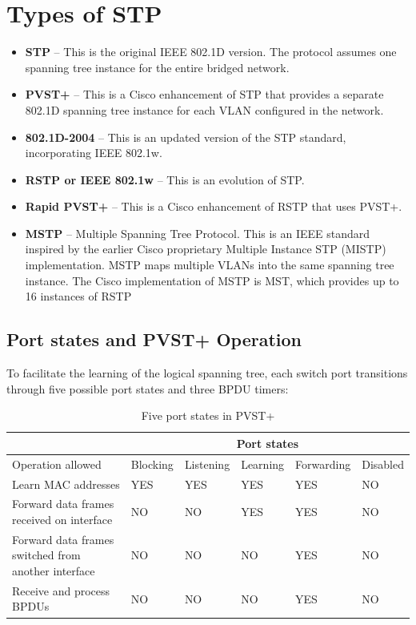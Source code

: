 \section{Types of STP}
\begin{itemize}
\item \textbf{STP} -- This is the original IEEE 802.1D version. The protocol assumes one spanning tree instance for the entire bridged network.
\item \textbf{PVST+} -- This is a Cisco enhancement of STP that provides a separate 802.1D spanning tree instance for each VLAN configured in the network.
\item \textbf{802.1D-2004} -- This is an updated version of the STP standard, incorporating IEEE 802.1w.
\item \textbf{RSTP or IEEE 802.1w} -- This is an evolution of STP.
\item \textbf{Rapid PVST+} -- This is a Cisco enhancement of RSTP that uses PVST+.
\item \textbf{MSTP} -- Multiple Spanning Tree Protocol. This is an IEEE standard inspired by the earlier Cisco proprietary Multiple Instance STP (MISTP) implementation. MSTP maps multiple VLANs into the same spanning tree instance. The Cisco implementation of MSTP is MST, which provides up to 16 instances of RSTP
\end{itemize}
\subsection{Port states and PVST+ Operation}
To facilitate the learning of the logical spanning tree, each switch port transitions through five possible port states and three BPDU timers:
\begin{table}[h!]
\centering
\caption{Five port states in PVST+}
\label{PVST-port-state}
\begin{tabular}{|p{}|l|l|l|l|l|}
\hline
                                                    & \multicolumn{5}{c|}{Port states}                        \\ \hline
Operation allowed                                   & Blocking & Listening & Learning & Forwarding & Disabled \\ \hline
Learn MAC addresses                                 & YES      & YES       & YES      & YES        & NO       \\ \hline
Forward data frames received on interface           & NO       & NO        & YES      & YES        & NO       \\ \hline
Forward data frames switched from another interface & NO       & NO        & NO       & YES        & NO       \\ \hline
Receive and process BPDUs                           & NO       & NO        & NO       & YES        & NO       \\ \hline
\end{tabular}
\end{table}
